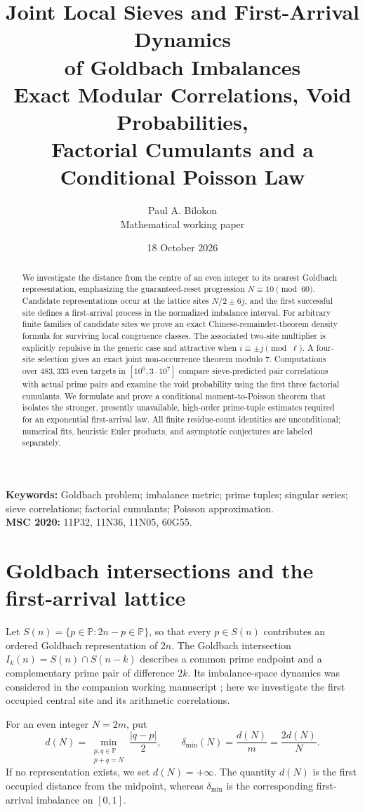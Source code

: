 \documentclass[11pt,a4paper]{article}
\title{\textbf{Joint Local Sieves and First-Arrival Dynamics\\of Goldbach Imbalances}\\[5pt]\large Exact Modular Correlations, Void Probabilities,\\Factorial Cumulants and a Conditional Poisson Law}
\author{Paul A. Bilokon\\\small Mathematical working paper}
\date{18 October 2026}
\theoremstyle{definition}
\newcommand{\PP}{\mathbb P}
\begin{document}
\maketitle
\begin{abstract}
We investigate the distance from the centre of an even integer to its nearest Goldbach representation, emphasizing the guaranteed-reset progression $N\equiv10\pmod{60}$.  Candidate representations occur at the lattice sites $N/2\pm6j$, and the first successful site defines a first-arrival process in the normalized imbalance interval.  For arbitrary finite families of candidate sites we prove an exact Chinese-remainder-theorem density formula for surviving local congruence classes.  The associated two-site multiplier is explicitly repulsive in the generic case and attractive when $i\equiv\pm j\pmod\ell$.  A four-site selection gives an exact joint non-occurrence theorem modulo $7$.  Computations over $483{,}333$ even targets in $[10^6,3\cdot10^7]$ compare sieve-predicted pair correlations with actual prime pairs and examine the void probability using the first three factorial cumulants.  We formulate and prove a conditional moment-to-Poisson theorem that isolates the stronger, presently unavailable, high-order prime-tuple estimates required for an exponential first-arrival law.  All finite residue-count identities are unconditional; numerical fits, heuristic Euler products, and asymptotic conjectures are labeled separately.
\end{abstract}
\vspace{-5pt}
\noindent\textbf{Keywords:} Goldbach problem; imbalance metric; prime tuples; singular series; sieve correlations; factorial cumulants; Poisson approximation.\\
\textbf{MSC 2020:} 11P32, 11N36, 11N05, 60G55.

\section{Goldbach intersections and the first-arrival lattice}
Let $S(n)=\{p\in\PP:2n-p\in\PP\}$, so that every $p\in S(n)$ contributes an ordered Goldbach representation of $2n$.  The Goldbach intersection $I_k(n)=S(n)\cap S(n-k)$ describes a common prime endpoint and a complementary prime pair of difference $2k$.  Its imbalance-space dynamics was considered in the companion working manuscript \cite{Bilokon2026Dynamics}; here we investigate the first occupied central site and its arithmetic correlations.

For an even integer $N=2m$, put
\begin{equation}\label{eq:distance}
 d(N)=\min_{\substack{p,q\in\PP\\p+q=N}}\frac{|q-p|}{2},\qquad
 \delta_{\min}(N)=\frac{d(N)}m=\frac{2d(N)}N.
\end{equation}
If no representation exists, we set $d(N)=+\infty$.  The quantity $d(N)$ is the first occupied distance from the midpoint, whereas $\delta_{\min}$ is the corresponding first-arrival imbalance on $[0,1]$.
\end{document}
